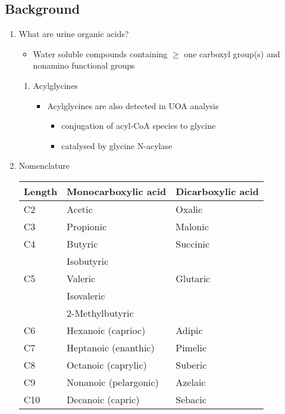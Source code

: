 \documentclass{scrartcl}
\begin{document}
\subsection{Background}
\label{sec:orgce49ed3}
\begin{enumerate}
\item What are urine organic acids?
\label{sec:org5515458}
\begin{itemize}
\item Water soluble compounds containing \(\ge\) one carboxyl group(s) and
nonamino functional groups
\end{itemize}

\begin{LaTeX}
\centering
{}
\end{LaTeX}

\begin{enumerate}
\item Acylglycines
\label{sec:orgb2a9077}
\begin{itemize}
\item Acylglycines are also detected in UOA analysis
\begin{itemize}
\item conjugation of acyl-CoA species to glycine
\item catalysed by glycine N-acylase
\end{itemize}
\end{itemize}
\end{enumerate}

\item Nomenclature
\label{sec:org2d480d6}

\begin{center}
\begin{tabular}{lll}
Length & Monocarboxylic acid & Dicarboxylic acid\\
\hline
C2 & Acetic & Oxalic\\
C3 & Propionic & Malonic\\
C4 & Butyric & Succinic\\
 & Isobutyric & \\
C5 & Valeric & Glutaric\\
 & Isovaleric & \\
 & 2-Methylbutyric & \\
C6 & Hexanoic (caprioc) & Adipic\\
C7 & Heptanoic (enanthic) & Pimelic\\
C8 & Octanoic (caprylic) & Suberic\\
C9 & Nonanoic (pelargonic) & Azelaic\\
C10 & Decanoic (capric) & Sebacic\\
\end{tabular}
\end{center}



\end{enumerate}
\end{document}
